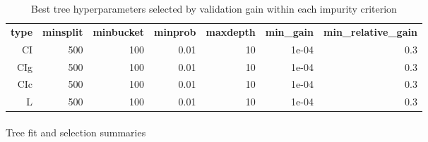 \documentclass[
  11pt,
  a4paper,
]{article}
\makeatletter
\let\oldparagraph\paragraph
\renewcommand{\paragraph}{
    \@ifstar
      \xxxParagraphStar
      \xxxParagraphNoStar
  }
\newcommand{\xxxParagraphStar}[1]{\oldparagraph*{#1}\mbox{}}
\newcommand{\xxxParagraphNoStar}[1]{\oldparagraph{#1}\mbox{}}
\makeatother
\begin{document}
\begingroup\fontsize{11}{13}\selectfont

\begin{longtable}[t]{rrrrrrr}

\caption{\label{tbl-appendix-tree-best-controls}Best tree
hyperparameters selected by validation gain within each impurity
criterion}

\tabularnewline

\\
\toprule
\textbf{type} & \textbf{minsplit} & \textbf{minbucket} & \textbf{minprob} & \textbf{maxdepth} & \textbf{min\_gain} & \textbf{min\_relative\_gain}\\
\midrule
CI & 500 & 100 & 0.01 & 10 & 1e-04 & 0.3\\
CIg & 500 & 100 & 0.01 & 10 & 1e-04 & 0.3\\
CIc & 500 & 100 & 0.01 & 10 & 1e-04 & 0.3\\
L & 500 & 100 & 0.01 & 10 & 1e-04 & 0.3\\
\bottomrule

\end{longtable}

\endgroup{}

\paragraph{Tree fit and selection
summaries}\label{tree-fit-and-selection-summaries}

\begingroup\fontsize{11}{13}\selectfont
\end{document}

